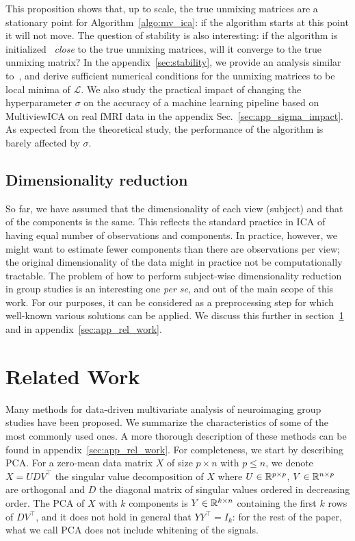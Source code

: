 This proposition shows that, up to scale, the true unmixing matrices are a stationary point for Algorithm~\ref{algo:mv_ica}: if the algorithm starts at this point it will not move.
%
The question of stability is also interesting: if the algorithm is initialized ~\emph{close} to the true unmixing matrices, will it converge to the true unmixing matrix?
%
In the appendix~\ref{sec:stability}, we provide an analysis similar to~\cite{cardoso1998blind}, and derive sufficient numerical conditions for the unmixing matrices to be local minima of $\mathcal{L}$.
%
We also study the practical impact of changing the hyperparameter $\sigma$ on the accuracy of a machine learning pipeline based on MultiviewICA on real fMRI data in the appendix Sec.~\ref{sec:app_sigma_impact}.
%
As expected from the theoretical study, the performance of the algorithm is barely affected by $\sigma$.
\subsection{Dimensionality reduction}
%
So far, we have assumed that the dimensionality of each view (subject) and that of the components is the same. This reflects the standard practice in ICA of having equal number of observations and components. 
%
In practice, however, we might want to estimate fewer components than there are observations per view; the original dimensionality of the data %
might in practice not be computationally tractable.
%
The problem of how to perform subject-wise dimensionality reduction in group studies 
is an interesting one \emph{per se}, and out of the main scope of this work. For our purposes, it can be considered as a preprocessing step for which well-known various solutions can be applied. %
We discuss this further in section~\ref{sec:rel_work} and in appendix~\ref{sec:app_rel_work}.
%
%
%
\section{Related Work}
\label{sec:rel_work}
Many methods for data-driven multivariate analysis of neuroimaging group studies have been proposed. We summarize the characteristics of some of the most commonly used ones. A more thorough description of these methods can be found in appendix~\ref{sec:app_rel_work}.
%
For completeness, we start by describing PCA. For a zero-mean data matrix $X$ of size $p\times n$ with $p \leq n$, we denote $X= UD V^{\top}$ the singular value decomposition of $X$ where $U \in \mathbb{R}^{p\times p}$, $V \in \mathbb{R}^{n \times p}$ are orthogonal and $D$ the diagonal matrix of singular values ordered in decreasing order.
%
The PCA of $X$ with $k$ components is $Y\in\mathbb{R}^{k\times n}$ containing the first $k$ rows of $DV^{\top}$, and it does not hold in general that $YY^{\top}=I_k$: for the rest of the paper, what we call PCA does not include whitening of the signals.


